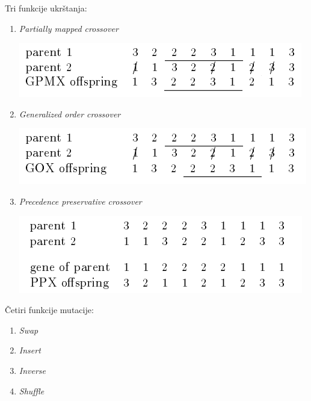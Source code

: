 \documentclass[12pt, a4paper]{article}
\begin{document}
Tri funkcije ukrštanja:
\begin{enumerate}
	\item \textit{Partially mapped crossover}

	\vspace{0.5cm}
	\begin{center}
	  \includegraphics[width=0.8\linewidth]{img/partially_mapped_crossover.png}
	\end{center}
	\vspace{0.5cm}

	\item \textit{Generalized order crossover}

	\vspace{0.5cm}
	\begin{center}
	  \includegraphics[width=0.8\linewidth]{img/generalized_order_crossover.png}
	\end{center}
	\vspace{0.5cm}

	\item \textit{Precedence preservative crossover}

	\vspace{0.5cm}
	\begin{center}
	  \includegraphics[width=0.8\linewidth]{img/precedence_preservative_crossover.png}
	\end{center}
	\vspace{0.5cm}

\end{enumerate}



 Četiri funkcije mutacije:
\begin{enumerate}
	\item \textit{Swap}
	\item \textit{Insert}
	\item \textit{Inverse} 
	\item \textit{Shuffle} \\
\end{enumerate}
\end{document}

